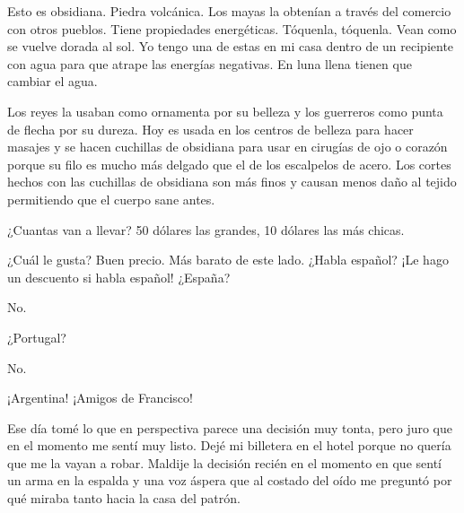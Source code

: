 \documentclass[12pt,twoside,openright,a5paper]{book}
\begin{document}
\vspace{0.5cm}

\hrulefill\hspace{0.2cm} \decofourleft\decofourright \hspace{0.2cm} \hrulefill
\vspace{0.5cm}

Esto es obsidiana. Piedra volcánica. Los mayas la obtenían a través
del comercio con otros pueblos. Tiene propiedades energéticas. Tóquenla,
tóquenla. Vean como se vuelve dorada al sol. Yo tengo una de estas en
mi casa dentro de un recipiente con agua para que atrape las energías
negativas. En luna llena tienen que cambiar el agua.

Los reyes la usaban como ornamenta por su belleza y los guerreros como punta
de flecha por su dureza. Hoy es usada en los centros de belleza para hacer
masajes y se hacen cuchillas de obsidiana para usar en cirugías de ojo o
corazón porque su filo es mucho más delgado que el de los escalpelos de
acero. Los cortes hechos con las cuchillas de obsidiana son más finos y
causan menos daño al tejido permitiendo que el cuerpo sane antes.

¿Cuantas van a llevar? 50 dólares las grandes, 10 dólares las más chicas.

\vspace{0.5cm}

\hrulefill\hspace{0.2cm} \decofourleft\decofourright \hspace{0.2cm} \hrulefill
\vspace{0.5cm}

¿Cuál le gusta? Buen precio. Más barato de este lado. ¿Habla español? ¡Le
hago un descuento si habla español! ¿España?

No.

¿Portugal?

No.

¡Argentina! ¡Amigos de Francisco!

\vspace{0.5cm}

\hrulefill\hspace{0.2cm} \decofourleft\decofourright \hspace{0.2cm} \hrulefill
\vspace{0.5cm}

Ese día tomé lo que en perspectiva parece una decisión muy tonta, pero
juro que en el momento me sentí muy listo. Dejé mi billetera en el hotel
porque no quería que me la vayan a robar. Maldije la decisión recién
en el momento en que sentí un arma en la espalda y una voz áspera que
al costado del oído me preguntó por qué miraba tanto hacia la casa del
patrón.
\end{document}
